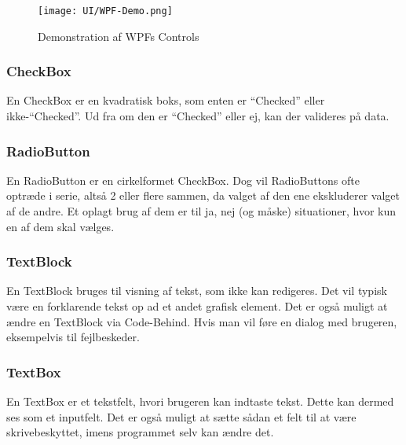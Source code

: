 \begin{wrapfigure}[22]{R}{0.5\textwidth}
    \label{img:wpfdemo}
    \vspace{-30pt}
    \begin{center}
        \texttt{[image: UI/WPF-Demo.png]}
    \end{center}
    \vspace{-15pt}
    \caption{Demonstration af WPFs Controls}
    \vspace{-15pt}
\end{wrapfigure}

\subsubsection*{CheckBox}
En CheckBox er en kvadratisk boks, som enten er ``Checked'' eller ikke-``Checked''. 
Ud fra om den er ``Checked'' eller ej, kan der valideres på data. 

\subsubsection*{RadioButton}
En RadioButton er en cirkelformet CheckBox.
Dog vil RadioButtons ofte optræde i serie, altså 2 eller flere sammen, da valget af den ene ekskluderer valget af de andre. 
Et oplagt brug af dem er til ja, nej (og måske) situationer, hvor kun en af dem skal vælges.

\subsubsection*{TextBlock}
En TextBlock bruges til visning af tekst, som ikke kan redigeres.
Det vil typisk være en forklarende tekst op ad et andet grafisk element.
Det er også muligt at ændre en TextBlock via Code-Behind. 
Hvis man vil føre en dialog med brugeren, eksempelvis til fejlbeskeder.

\subsubsection*{TextBox}
En TextBox er et tekstfelt, hvori brugeren kan indtaste tekst. 
Dette kan dermed ses som et inputfelt. 
Det er også muligt at sætte sådan et felt til at være skrivebeskyttet, imens programmet selv kan ændre det.

